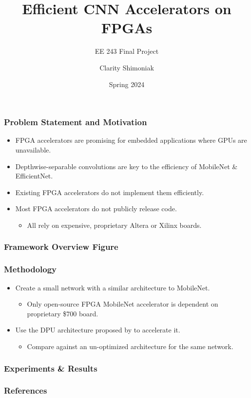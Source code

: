 \documentclass[english]{beamer}
\begin{document}
\title{Efficient CNN Accelerators on FPGAs}
\subtitle{EE 243 Final Project}
\author{Clarity Shimoniak}
\date{Spring 2024}
\frame{\titlepage}


\begin{frame}
\frametitle{Problem Statement and Motivation}
\begin{itemize}
	\item FPGA accelerators are promising for embedded applications where GPUs
	are unavailable.
	\item Depthwise-separable convolutions are key to the efficiency of
	MobileNet \& EfficientNet.
	\item Existing FPGA accelerators do not implement them efficiently.
	\item Most FPGA accelerators do not publicly release code.
	\begin{itemize}
		\item All rely on expensive, proprietary Altera or Xilinx boards.
	\end{itemize}
\end{itemize}
\end{frame}


\begin{frame}
\frametitle{Framework Overview Figure}
\end{frame}


\begin{frame}
\frametitle{Methodology}
\begin{itemize}
	\item Create a small network with a similar architecture to MobileNet.
	\begin{itemize}
		\item Only open-source FPGA MobileNet
		accelerator\supercite{solovyev2019mobilenet} is dependent on
		proprietary \$700 board.
	\end{itemize}
	\item Use the DPU architecture proposed by
	\citeauthor{mobilenet2019fpga}\supercite{mobilenet2019fpga}
	to accelerate it.
	\begin{itemize}
		\item Compare against an un-optimized architecture for the same network.
	\end{itemize}
\end{itemize}
\end{frame}


\begin{frame}
\frametitle{Experiments \& Results}
\end{frame}


\begin{frame}
\frametitle{References}
\printbibliography
\end{frame}
\end{document}
